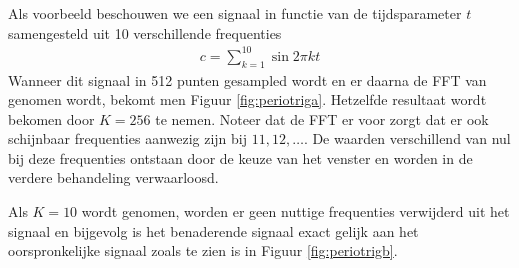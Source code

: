 \documentclass[a4paper]{article}
\begin{document}
Als voorbeeld beschouwen we een signaal in functie van de tijdsparameter $t$ samengesteld uit 10 verschillende frequenties
\begin{align}
c=\sum_{k=1}^{10} \sin{2\pi kt}
\end{align}
Wanneer dit signaal in 512 punten gesampled wordt en er daarna de FFT van genomen wordt, bekomt men Figuur \ref{fig:periotriga}. Hetzelfde resultaat wordt bekomen door $K=256$ te nemen. Noteer dat de FFT er voor zorgt dat er ook schijnbaar frequenties aanwezig zijn bij $11,12,\dots$. De waarden verschillend van nul bij deze frequenties ontstaan door de keuze van het venster en worden in de verdere behandeling verwaarloosd.

Als $K=10$ wordt genomen, worden er geen nuttige frequenties verwijderd uit het signaal en bijgevolg is het benaderende signaal exact gelijk aan het oorspronkelijke signaal zoals te zien is in Figuur \ref{fig:periotrigb}.
\end{document}
